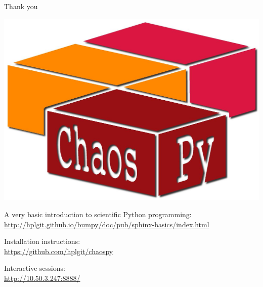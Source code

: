 \documentclass{beamer}
\begin{document}
 
\begin{frame}[fragile]{Thank you}
  \begin{center}
     \includegraphics[width=.5\textwidth]{chaospy_logo.jpg}
  \end{center}
    \begin{alert}{A very basic introduction to scientific Python programming:}
    \scriptsize
      \href{http://hplgit.github.io/bumpy/doc/pub/sphinx-basics/index.html}{http://hplgit.github.io/bumpy/doc/pub/sphinx-basics/index.html}\\
  \end{alert}
  \begin{alert}{Installation instructions:}\\
  \scriptsize
      \href{https://github.com/hplgit/chaospy}{https://github.com/hplgit/chaospy}\\
  \end{alert}
    \begin{alert}{Interactive sessions:}\\
  \scriptsize
\href{http://10.50.3.247:8888/}{http://10.50.3.247:8888/}

  \end{alert}
\end{frame}
\end{document}
